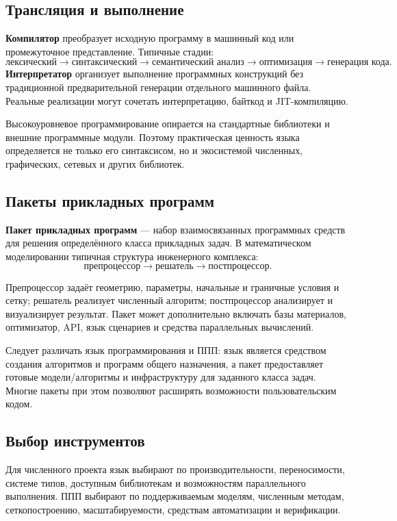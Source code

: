 \subsection{Трансляция и выполнение}

\textbf{Компилятор} преобразует исходную программу в машинный код или промежуточное представление. Типичные стадии:
\[
\text{лексический}
\rightarrow
\text{синтаксический}
\rightarrow
\text{семантический анализ}
\rightarrow
\text{оптимизация}
\rightarrow
\text{генерация кода}.
\]
\textbf{Интерпретатор} организует выполнение программных конструкций без традиционной предварительной генерации отдельного машинного файла. Реальные реализации могут сочетать интерпретацию, байткод и JIT-компиляцию.

Высокоуровневое программирование опирается на стандартные библиотеки и внешние программные модули. Поэтому практическая ценность языка определяется не только его синтаксисом, но и экосистемой численных, графических, сетевых и других библиотек.

\subsection{Пакеты прикладных программ}

\textbf{Пакет прикладных программ} --- набор взаимосвязанных программных средств для решения определённого класса прикладных задач. В математическом моделировании типичная структура инженерного комплекса:
\[
\boxed{\text{препроцессор}\rightarrow\text{решатель}\rightarrow\text{постпроцессор}}.
\]

Препроцессор задаёт геометрию, параметры, начальные и граничные условия и сетку; решатель реализует численный алгоритм; постпроцессор анализирует и визуализирует результат. Пакет может дополнительно включать базы материалов, оптимизатор, API, язык сценариев и средства параллельных вычислений.

Следует различать язык программирования и ППП: язык является средством создания алгоритмов и программ общего назначения, а пакет предоставляет готовые модели/алгоритмы и инфраструктуру для заданного класса задач. Многие пакеты при этом позволяют расширять возможности пользовательским кодом.

\subsection{Выбор инструментов}

Для численного проекта язык выбирают по производительности, переносимости, системе типов, доступным библиотекам и возможностям параллельного выполнения. ППП выбирают по поддерживаемым моделям, численным методам, сеткопостроению, масштабируемости, средствам автоматизации и верификации.

